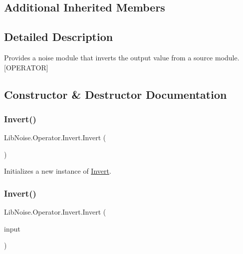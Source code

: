 \subsection*{Additional Inherited Members}


\subsection{Detailed Description}
Provides a noise module that inverts the output value from a source module. \mbox{[}O\+P\+E\+R\+A\+T\+OR\mbox{]} 



\subsection{Constructor \& Destructor Documentation}
\mbox{\label{class_lib_noise_1_1_operator_1_1_invert_af95c50dac5083d38fdb8589614b6ad48}} 
\subsubsection{\texorpdfstring{Invert()}{Invert()}\hspace{0.1cm}{\footnotesize\ttfamily [1/2]}}
{\footnotesize\ttfamily Lib\+Noise.\+Operator.\+Invert.\+Invert (\begin{DoxyParamCaption}{ }\end{DoxyParamCaption})}



Initializes a new instance of \hyperlink{class_lib_noise_1_1_operator_1_1_invert}{Invert}. 

\mbox{\label{class_lib_noise_1_1_operator_1_1_invert_aa46cc15f3a4329e8d06665c2685f852f}} 
\subsubsection{\texorpdfstring{Invert()}{Invert()}\hspace{0.1cm}{\footnotesize\ttfamily [2/2]}}
{\footnotesize\ttfamily Lib\+Noise.\+Operator.\+Invert.\+Invert (\begin{DoxyParamCaption}\item[{\hyperlink{class_lib_noise_1_1_module_base}{Module\+Base}}]{input }\end{DoxyParamCaption})}



